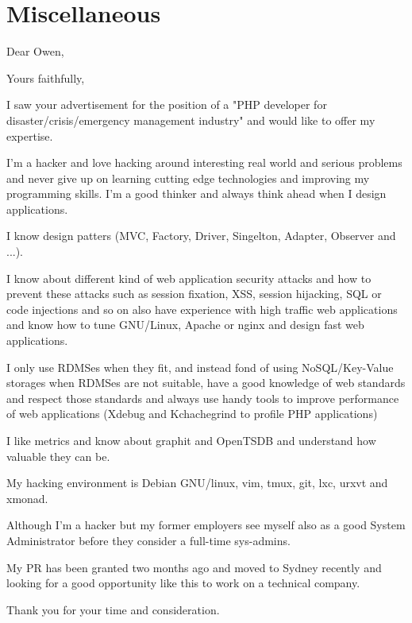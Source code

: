 \documentclass[9pt,a4paper,sans]{moderncv}   %
\begin{document}
\section{Miscellaneous}

\clearpage
{}
\date{January 01, 1984}
\opening{Dear Owen,}
\closing{Yours faithfully,}
\makelettertitle

I saw your advertisement for the position of a "PHP developer for
disaster/crisis/emergency management industry" and would like to offer my expertise.

I'm a hacker and love hacking around interesting real world and serious problems and 
never give up on learning cutting edge technologies and improving my programming
skills. I'm a good thinker and always think ahead when I design applications.

I know design patters (MVC, Factory, Driver, Singelton, Adapter,
Observer and ...).

I know about different kind of web application security attacks and how
to prevent these attacks such as session fixation, XSS, session
hijacking, SQL or code injections and so on also have experience with high
traffic web applications and know how to tune GNU/Linux, Apache or nginx
and design fast web applications.

I only use RDMSes when they fit, and instead fond of using NoSQL/Key-Value
storages when RDMSes are not suitable, have a good knowledge of web standards
and respect those standards and always use handy tools to improve performance
of web applications (Xdebug and Kchachegrind to profile PHP applications)

I like metrics and know about graphit and OpenTSDB and understand
how valuable they can be.

My hacking environment is Debian GNU/linux, vim, tmux, git, lxc, urxvt
and xmonad.

Although I'm a hacker but my former employers see myself also as a
good System Administrator before they consider a full-time sys-admins.

My PR has been granted two months ago and moved to Sydney recently
and looking for a good opportunity like this to work on a technical company.

Thank you for your time and consideration.

\makeletterclosing
\end{document}
